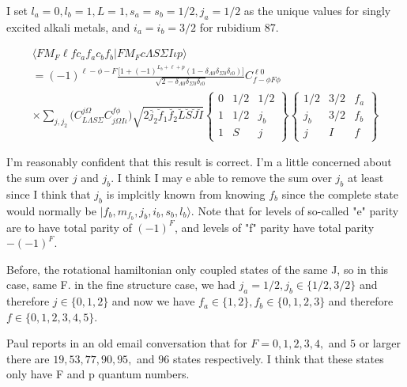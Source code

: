 \documentclass[prl, longbibliography, aps, 10pt]{revtex4-2}
\begin{document}
I set $l_a=0, l_b=1, L=1, s_a=s_b=1/2,j_a=1/2$ as the unique values for singly excited alkali metals, and $i_a=i_b=3/2$ for rubidium 87.

\begin{equation}
\begin{split}
\langle F M_F \ell f c_a f_a c_b f_b |F M_F c \Lambda S \Sigma I \iota p\rangle
\\
= 
(-1)^{\ell-\phi-F}
\frac{\Big[1+(-1)^{L_b+\ell+p}(1-\delta_{\Lambda 0}\delta_{\Sigma 0} \delta_{\iota 0})\Big]}
{\sqrt{2-\delta_{\Lambda 0}\delta_{\Sigma 0} \delta_{\iota 0}}} 
C_{f -\phi F \phi}^{\ell 0} 
\\
\times\sum_{j, j_2} 
\bigg(
C_{L\Lambda S\Sigma}^{j\Omega} 
C_{j\Omega I \iota}^{f \phi}
\bigg)
\sqrt{2\breve{j_2}\breve{f}_1\breve{f_2}
\breve{L}\breve{S}\breve{J}\breve{I}}
\begin{Bmatrix}
0 & 1/2 & 1/2\\
1 & 1/2 & j_b\\
1 & S & j
\end{Bmatrix}
\begin{Bmatrix}
1/2 & 3/2 & f_a\\
j_b & 3/2 & f_b\\
j & I & f
\end{Bmatrix}
\end{split}
\end{equation}

I'm reasonably confident that this result is correct. I'm a little concerned about the sum over $j$ and $j_b$. I think I may e able to remove the sum over $j_b$ at least since I think that $j_b$ is implcitly known from knowing $f_b$ since the complete state would normally be $|f_b, m_{f_b}, j_b, i_b, s_b, l_b\rangle$. Note that for levels of so-called "e" parity are to have total parity of $(-1)^F$, and levels of "f" parity have total parity $-(-1)^F$. 

Before, the rotational hamiltonian only coupled states of the same J, so in this case, same F. in the fine structure case, we had $j_a=1/2, j_b\in\{1/2,3/2\}$ and therefore $j\in\{0,1,2\}$ and now we have $f_a\in\{1,2\}, f_b\in\{0,1,2,3\}$ and therefore $f\in\{0,1,2,3,4,5\}$. 

Paul reports in an old email conversation that for $F=0,1,2,3,4, $ and $5$ or larger there are $19, 53, 77, 90, 95, $ and $96$ states respectively. I think that these states only have F and p quantum numbers. 


\end{document}
